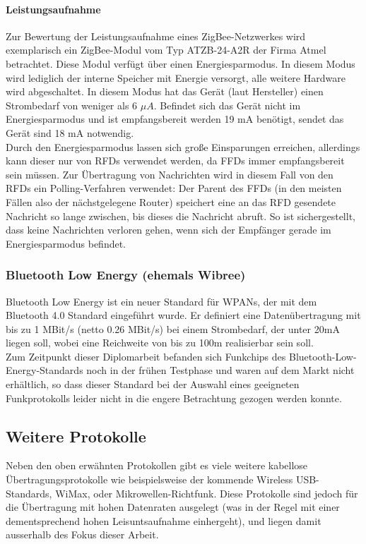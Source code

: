             \paragraph{Leistungsaufnahme}
                Zur Bewertung der Leistungsaufnahme eines ZigBee-Netzwerkes wird exemplarisch ein ZigBee-Modul
                vom Typ ATZB-24-A2R der Firma Atmel betrachtet. Diese Modul verfügt über einen Energiesparmodus.
                In diesem Modus wird lediglich der interne Speicher mit Energie versorgt, alle weitere Hardware
                wird abgeschaltet. In diesem Modus hat das Gerät (laut Hersteller) einen Strombedarf von weniger als
                6 $\mu{}A$. Befindet sich das Gerät nicht im Energiesparmodus und ist empfangsbereit werden 19 mA
                benötigt, sendet das Gerät sind 18 mA notwendig.\\
                Durch den Energiesparmodus lassen sich große Einsparungen erreichen, allerdings kann dieser nur von 
                RFDs verwendet werden, da FFDs immer empfangsbereit sein müssen. Zur Übertragung von Nachrichten
                wird in diesem Fall von den RFDs ein Polling-Verfahren verwendet: Der Parent des FFDs (in den meisten
                Fällen also der nächstgelegene Router) speichert eine an das RFD gesendete Nachricht so lange zwischen,
                bis dieses die Nachricht abruft. So ist sichergestellt, dass keine Nachrichten verloren gehen, wenn
                sich der Empfänger gerade im Energiesparmodus befindet.
           

        \subsubsection{Bluetooth Low Energy (ehemals Wibree)}\label{wibree}
            Bluetooth Low Energy ist ein neuer Standard für WPANs, der mit dem Bluetooth 4.0 Standard eingeführt
            wurde. Er definiert eine Datenübertragung mit bis zu 1 MBit/s (netto 0.26 MBit/s) bei einem Strombedarf,
            der unter 20mA liegen soll, wobei eine Reichweite von bis zu 100m realisierbar sein soll.\\
            Zum Zeitpunkt dieser Diplomarbeit befanden sich Funkchips des Bluetooth-Low-Energy-Standards noch in 
            der frühen Testphase und waren auf dem Markt nicht erhältlich, so dass dieser Standard bei der Auswahl
            eines geeigneten Funkprotokolls leider nicht in die engere Betrachtung gezogen werden konnte.
            

    \subsection{Weitere Protokolle}
        Neben den oben erwähnten Protokollen gibt es viele weitere kabellose Übertragungsprotokolle wie beispielsweise 
        der kommende Wireless USB-Standards, WiMax, oder Mikrowellen-Richtfunk. Diese Protokolle sind jedoch für die
        Übertragung mit hohen Datenraten ausgelegt (was in der Regel mit einer dementsprechend hohen Leisuntsaufnahme
        einhergeht), und liegen damit ausserhalb des Fokus dieser Arbeit.


